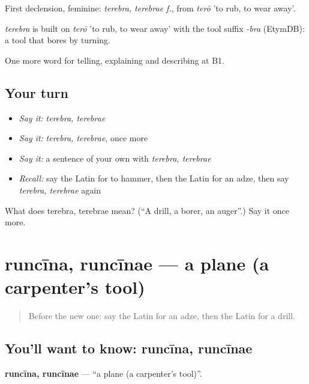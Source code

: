 First declension, feminine: \emph{terebra, terebrae f.}, from \emph{terō} 'to rub, to wear away'.

\begin{cousinweb}
\emph{terebra} is built on \emph{terō} 'to rub, to wear away' with the tool suffix \emph{-bra} (EtymDB): a tool that bores by turning.
\end{cousinweb}

\begin{grammarlens}[title={What you've built}]
One more word for telling, explaining and describing at B1.
\end{grammarlens}

\subsection*{Your turn}
\begin{itemize}
\raggedright
  \item \emph{Say it:} \emph{terebra, terebrae}
  \item \emph{Say it:} \emph{terebra, terebrae}, once more
  \item \emph{Say it:} a sentence of your own with \emph{terebra, terebrae}
  \item \emph{Recall:} say the Latin for to hammer, then the Latin for an adze, then say \emph{terebra, terebrae} again
\end{itemize}

\begin{tcolorbox}[breakable,colback=teal!4,colframe=teal!35!black,title={Before you move on}]
What does terebra, terebrae mean? (\textquotedblleft{}A drill, a borer, an auger\textquotedblright{}.) Say it once more.
\end{tcolorbox}
\section[runcīna, runcīnae]{runcīna, runcīnae — a plane (a carpenter's tool)}

\label{lesson:LA-C470-runcina}



\begin{quote}
Before the new one: say the Latin for an adze, then the Latin for a drill.
\end{quote}

\subsection*{You'll want to know: runcīna, runcīnae}
\textbf{runcīna, runcīnae} — \textquotedblleft{}a plane (a carpenter's tool)\textquotedblright{}.

